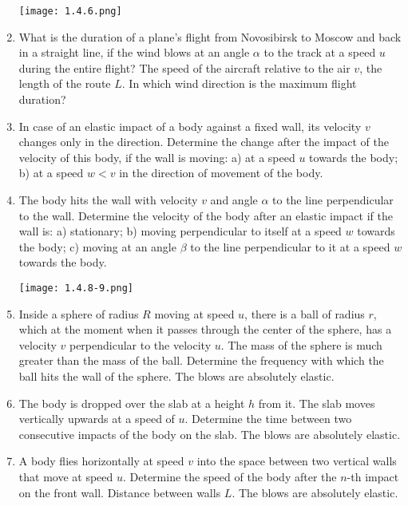 \documentclass{article}
\begin{document}
\begin{enumerate}[label=1.4.\arabic*]
\begin{center}
    \texttt{[image: 1.4.6.png]}
\end{center}

\item What is the duration of a plane's flight from Novosibirsk to Moscow and back in a straight line, if the wind blows at an angle $\alpha$ to the track at a speed $u$ during the entire flight? The speed of the aircraft relative to the air $v$, the length of the route $L$. In which wind direction is the maximum flight duration?

\item In case of an elastic impact of a body against a fixed wall, its velocity $v$ changes only in the direction. Determine the change after the impact of the velocity of this body, if the wall is moving: a) at a speed $u$ towards the body; b) at a speed $w < v$ in the direction of movement of the body.

\item The body hits the wall with velocity $v$ and angle $\alpha$ to the line perpendicular to the wall. Determine the velocity of the body after an elastic impact if the wall is: a) stationary; b) moving perpendicular to itself at a speed $w$ towards the body; c) moving at an angle $\beta$ to the line perpendicular to it at a speed $w$ towards the body.

\begin{center}
    \texttt{[image: 1.4.8-9.png]}
\end{center}

\item Inside a sphere of radius $R$ moving at speed $u$, there is a ball of radius $r$, which at the moment when it passes through the center of the sphere, has a velocity $v$ perpendicular to the velocity $u$. The mass of the sphere is much greater than the mass of the ball. Determine the frequency with which the ball hits the wall of the sphere. The blows are absolutely elastic.

\item The body is dropped over the slab at a height $h$ from it. The slab moves vertically upwards at a speed of $u$. Determine the time between two consecutive impacts of the body on the slab. The blows are absolutely elastic.

\item A body flies horizontally at speed $v$ into the space between two vertical walls that move at speed $u$. Determine the speed of the body after the $n$-th impact on the front wall. Distance between walls $L$. The blows are absolutely elastic.


\end{enumerate}
\end{document}
